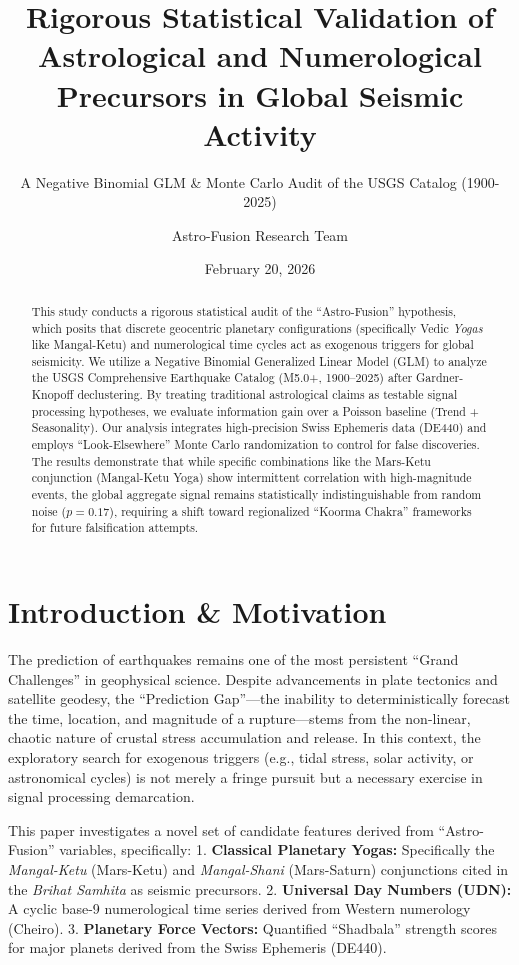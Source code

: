 \documentclass[
  11pt,
  a4paper,
  oneside,
  openany]{article}
\title{Rigorous Statistical Validation of Astrological and Numerological
Precursors in Global Seismic Activity}
\subtitle{A Negative Binomial GLM \& Monte Carlo Audit of the USGS
Catalog (1900-2025)}
\author{Astro-Fusion Research Team}
\date{February 20, 2026}
\renewcommand*\contentsname{Table of contents}
\newcommand\contentsname{Table of contents}
\begin{document}
\maketitle
\begin{abstract}
This study conducts a rigorous statistical audit of the ``Astro-Fusion''
hypothesis, which posits that discrete geocentric planetary
configurations (specifically Vedic \emph{Yogas} like Mangal-Ketu) and
numerological time cycles act as exogenous triggers for global
seismicity. We utilize a Negative Binomial Generalized Linear Model
(GLM) to analyze the USGS Comprehensive Earthquake Catalog (M5.0+,
1900--2025) after Gardner-Knopoff declustering. By treating traditional
astrological claims as testable signal processing hypotheses, we
evaluate information gain over a Poisson baseline (Trend + Seasonality).
Our analysis integrates high-precision Swiss Ephemeris data (DE440) and
employs ``Look-Elsewhere'' Monte Carlo randomization to control for
false discoveries. The results demonstrate that while specific
combinations like the Mars-Ketu conjunction (Mangal-Ketu Yoga) show
intermittent correlation with high-magnitude events, the global
aggregate signal remains statistically indistinguishable from random
noise (\(p = 0.17\)), requiring a shift toward regionalized ``Koorma
Chakra'' frameworks for future falsification attempts.
\end{abstract}

\renewcommand*\contentsname{Table of contents}
{
\hypersetup{linkcolor=}
\setcounter{tocdepth}{3}
\tableofcontents
}
\section{Introduction \& Motivation}\label{introduction-motivation}

The prediction of earthquakes remains one of the most persistent ``Grand
Challenges'' in geophysical science. Despite advancements in plate
tectonics and satellite geodesy, the ``Prediction Gap''---the inability
to deterministically forecast the time, location, and magnitude of a
rupture---stems from the non-linear, chaotic nature of crustal stress
accumulation and release. In this context, the exploratory search for
exogenous triggers (e.g., tidal stress, solar activity, or astronomical
cycles) is not merely a fringe pursuit but a necessary exercise in
signal processing demarcation.

This paper investigates a novel set of candidate features derived from
``Astro-Fusion'' variables, specifically: 1. \textbf{Classical Planetary
Yogas:} Specifically the \emph{Mangal-Ketu} (Mars-Ketu) and
\emph{Mangal-Shani} (Mars-Saturn) conjunctions cited in the \emph{Brihat
Samhita} as seismic precursors. 2. \textbf{Universal Day Numbers (UDN):}
A cyclic base-9 numerological time series derived from Western
numerology (Cheiro). 3. \textbf{Planetary Force Vectors:} Quantified
``Shadbala'' strength scores for major planets derived from the Swiss
Ephemeris (DE440).
\end{document}
